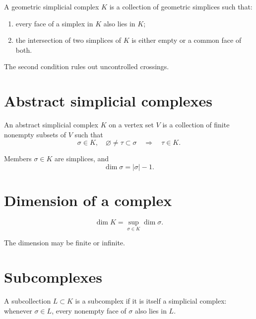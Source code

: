 \begin{definition}
\label{def:viii15-geometric-complex}
A geometric simplicial complex \(K\) is a collection of geometric simplices
such that:
\begin{enumerate}
\item every face of a simplex in \(K\) also lies in \(K\);
\item the intersection of two simplices of \(K\) is either empty or a common
face of both.
\end{enumerate}
\end{definition}

The second condition rules out uncontrolled crossings.

\section{Abstract simplicial complexes}

\begin{definition}
\label{def:viii15-abstract-complex}
An abstract simplicial complex \(K\) on a vertex set \(V\) is a collection of
finite nonempty subsets of \(V\) such that
\[
\sigma\in K,\quad \varnothing\ne\tau\subset\sigma
\quad\Longrightarrow\quad
\tau\in K.
\]
\end{definition}

Members \(\sigma\in K\) are simplices, and
\[
\dim\sigma=|\sigma|-1.
\]

\section{Dimension of a complex}

\begin{definition}
\label{def:viii15-complex-dim}
\[
\dim K=\sup_{\sigma\in K}\dim\sigma.
\]
\end{definition}

The dimension may be finite or infinite.

\section{Subcomplexes}

\begin{definition}[Subcomplex]
\label{def:viii15-subcomplex}
A subcollection \(L\subset K\) is a subcomplex if it is itself a simplicial
complex: whenever \(\sigma\in L\), every nonempty face of \(\sigma\) also lies
in \(L\).
\end{definition}

